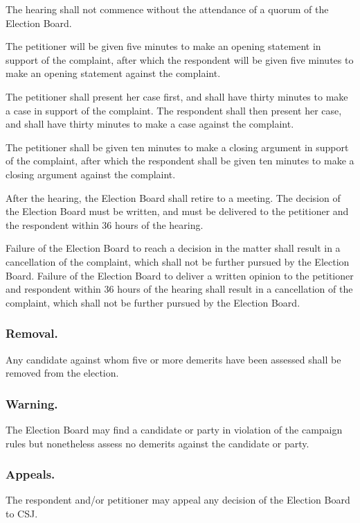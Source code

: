 \subsubsubsection{}
The hearing shall not commence without the attendance of a quorum of the Election Board.

\subsubsubsection{}
The petitioner will be given five minutes to make an opening statement in support of the complaint, after which the respondent will be given five minutes to make an opening statement against the complaint.

\subsubsubsection{}
The petitioner shall present her case first, and shall have thirty minutes to make a case in support of the complaint.  The respondent shall then present her case, and shall have thirty minutes to make a case against the complaint.

\subsubsubsection{}
The petitioner shall be given ten minutes to make a closing argument in support of the complaint, after which the respondent shall be given ten minutes to make a closing argument against the complaint.

\subsubsubsection{}
After the hearing, the Election Board shall retire to a meeting.  The decision of the Election Board must be written, and must be delivered to the petitioner and the respondent within 36 hours of the hearing.  

\subsubsubsection{}
Failure of the Election Board to reach a decision in the matter shall result in a cancellation of the complaint, which shall not be further pursued by the Election Board.  Failure of the Election Board to deliver a written opinion to the petitioner and respondent within 36 hours of the hearing shall result in a cancellation of the complaint, which shall not be further pursued by the Election Board.


\subsubsection{Removal.}
Any candidate against whom five or more demerits have been assessed shall be removed from the election.  

\subsubsection{Warning.}
The Election Board may find a candidate or party in violation of the campaign rules but nonetheless assess no demerits against the candidate or party.

\subsubsection{Appeals.}
The respondent and/or petitioner may appeal any decision of the Election Board to CSJ.  


